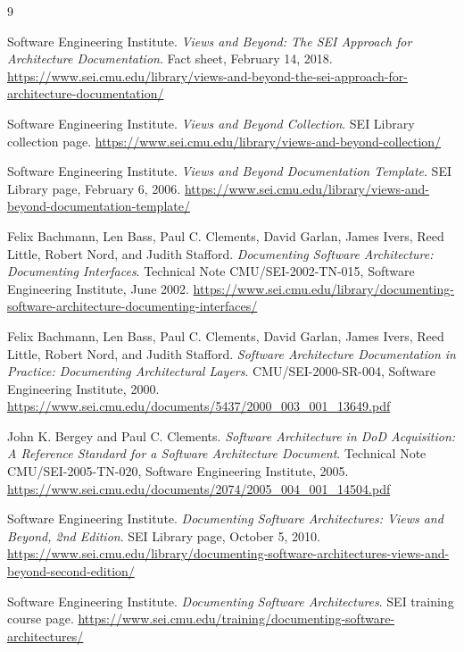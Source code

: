 \documentclass[11pt]{article}
\begin{document}
\begin{thebibliography}{9}

Software Engineering Institute.
\newblock \emph{Views and Beyond: The SEI Approach for Architecture Documentation}.
\newblock Fact sheet, February 14, 2018.
\newblock \url{https://www.sei.cmu.edu/library/views-and-beyond-the-sei-approach-for-architecture-documentation/}

Software Engineering Institute.
\newblock \emph{Views and Beyond Collection}.
\newblock SEI Library collection page.
\newblock \url{https://www.sei.cmu.edu/library/views-and-beyond-collection/}

Software Engineering Institute.
\newblock \emph{Views and Beyond Documentation Template}.
\newblock SEI Library page, February 6, 2006.
\newblock \url{https://www.sei.cmu.edu/library/views-and-beyond-documentation-template/}

Felix Bachmann, Len Bass, Paul C. Clements, David Garlan, James Ivers, Reed Little, Robert Nord, and Judith Stafford.
\newblock \emph{Documenting Software Architecture: Documenting Interfaces}.
\newblock Technical Note CMU/SEI-2002-TN-015, Software Engineering Institute, June 2002.
\newblock \url{https://www.sei.cmu.edu/library/documenting-software-architecture-documenting-interfaces/}

Felix Bachmann, Len Bass, Paul C. Clements, David Garlan, James Ivers, Reed Little, Robert Nord, and Judith Stafford.
\newblock \emph{Software Architecture Documentation in Practice: Documenting Architectural Layers}.
\newblock CMU/SEI-2000-SR-004, Software Engineering Institute, 2000.
\newblock \url{https://www.sei.cmu.edu/documents/5437/2000_003_001_13649.pdf}

John K. Bergey and Paul C. Clements.
\newblock \emph{Software Architecture in DoD Acquisition: A Reference Standard for a Software Architecture Document}.
\newblock Technical Note CMU/SEI-2005-TN-020, Software Engineering Institute, 2005.
\newblock \url{https://www.sei.cmu.edu/documents/2074/2005_004_001_14504.pdf}

Software Engineering Institute.
\newblock \emph{Documenting Software Architectures: Views and Beyond, 2nd Edition}.
\newblock SEI Library page, October 5, 2010.
\newblock \url{https://www.sei.cmu.edu/library/documenting-software-architectures-views-and-beyond-second-edition/}

Software Engineering Institute.
\newblock \emph{Documenting Software Architectures}.
\newblock SEI training course page.
\newblock \url{https://www.sei.cmu.edu/training/documenting-software-architectures/}

\end{thebibliography}
\end{document}
